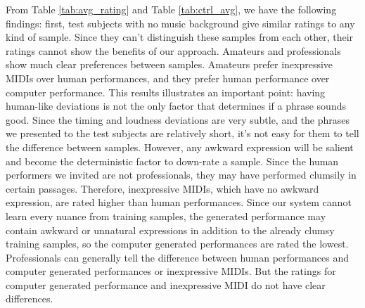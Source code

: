 From Table \ref{tab:avg_rating} and Table \ref{tab:ctrl_avg}, we have the following findings: first, test subjects with no music background give similar ratings to any kind of sample. Since they can't distinguish these samples from each other, their ratings cannot show the benefits of our approach. Amateurs and professionals show much clear preferences between samples. Amateurs prefer inexpressive MIDIs over human performances, and they prefer human performance over computer performance. This results illustrates an important point: having human-like deviations is not the only factor that determines if a phrase sounds good. Since the timing and loudness deviations are very subtle, and the phrases we presented to the test subjects are relatively short, it's not easy for them to tell the difference between samples. However, any awkward expression will be salient and become the deterministic factor to down-rate a sample. Since the human performers we invited are not professionals, they may have performed clumsily in certain passages. Therefore, inexpressive MIDIs, which have no awkward expression, are rated higher than human performances. Since our system cannot learn every nuance from training samples, the generated performance may contain awkward or unnatural expressions in addition to the already clumsy training samples, so the computer generated performances are rated the lowest. Professionals can generally tell the difference between human performances and computer generated performances or inexpressive MIDIs. But the ratings for computer generated performance and inexpressive MIDI do not have clear differences.




